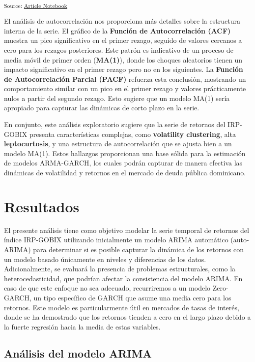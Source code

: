 \documentclass[
  number,
  preprint,
  3p,
  onecolumn]{elsarticle}
\begin{document}
\textsubscript{Source:
\href{https://iancont.github.io/fixed_income_garch/index.qmd.html}{Article
Notebook}}

El análisis de autocorrelación nos proporciona más detalles sobre la
estructura interna de la serie. El gráfico de la \textbf{Función de
Autocorrelación (ACF)} muestra un pico significativo en el primer
rezago, seguido de valores cercanos a cero para los rezagos posteriores.
Este patrón es indicativo de un proceso de media móvil de primer orden
(\textbf{MA(1)}), donde los choques aleatorios tienen un impacto
significativo en el primer rezago pero no en los siguientes. La
\textbf{Función de Autocorrelación Parcial (PACF)} refuerza esta
conclusión, mostrando un comportamiento similar con un pico en el primer
rezago y valores prácticamente nulos a partir del segundo rezago. Esto
sugiere que un modelo MA(1) sería apropiado para capturar las dinámicas
de corto plazo en la serie.

En conjunto, este análisis exploratorio sugiere que la serie de retornos
del IRP-GOBIX presenta características complejas, como
\textbf{volatility clustering}, alta \textbf{leptocurtosis}, y una
estructura de autocorrelación que se ajusta bien a un modelo MA(1).
Estos hallazgos proporcionan una base sólida para la estimación de
modelos ARMA-GARCH, los cuales podrán capturar de manera efectiva las
dinámicas de volatilidad y retornos en el mercado de deuda pública
dominicano.

\section{Resultados}\label{resultados}

El presente análisis tiene como objetivo modelar la serie temporal de
retornos del índice IRP-GOBIX utilizando inicialmente un modelo ARIMA
automático (auto-ARIMA) para determinar si es posible capturar la
dinámica de los retornos con un modelo basado únicamente en niveles y
diferencias de los datos. Adicionalmente, se evaluará la presencia de
problemas estructurales, como la heterocedasticidad, que podrían afectar
la consistencia del modelo ARIMA. En caso de que este enfoque no sea
adecuado, recurriremos a un modelo Zero-GARCH, un tipo específico de
GARCH que asume una media cero para los retornos. Este modelo es
particularmente útil en mercados de tasas de interés, donde se ha
demostrado que los retornos tienden a cero en el largo plazo debido a la
fuerte regresión hacia la media de estas variables.

\subsection{Análisis del modelo
ARIMA}\label{anuxe1lisis-del-modelo-arima}
\end{document}
